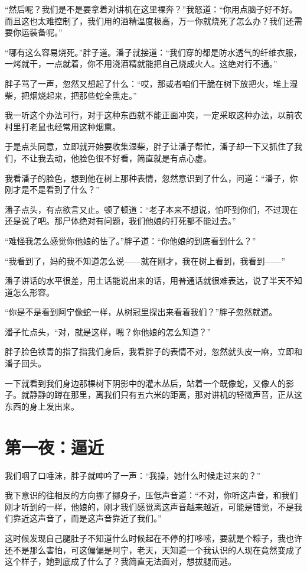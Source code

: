 “然后呢？我们是不是要拿着对讲机在这里裸奔？”我怒道：“你用点脑子好不好。而且这也太难控制了，我们用的酒精温度极高，万一你就烧死了怎么办？我们还需要你运装备呢。”

“哪有这么容易烧死。”胖子道。潘子就接道：“我们穿的都是防水透气的纤维衣服，一烤就干，一点就着，你不用浇酒精就能把自己烧成火人。这绝对行不通。”

胖子骂了一声，忽然又想起了什么：“哎，那或者咱们干脆在树下放把火，堆上湿柴，把烟烧起来，把那些蛇全熏走。”

我一听这个办法可行，对于这种东西就不能正面冲突，一定采取这种办法，以前农村里打老鼠也经常用这种烟熏。

于是点头同意，立即就开始要收集湿柴，胖子让潘子帮忙，潘子却一下又抓住了我们，不让我去动，他脸色很不好看，简直就是有点心虚。

我看潘子的脸色，想到他在树上那种表情，忽然意识到了什么，问道：“潘子，你刚才是不是看到了什么？”

潘子点头，有点欲言又止。顿了顿道：“老子本来不想说，怕吓到你们，不过现在还是说了吧。那尸体绝对有问题，我们他娘的打死都不能过去。”

“难怪我怎么感觉你他娘的怯了。”胖子道：“你他娘的到底看到什么？”

“我看到了，妈的我不知道怎么说——就在刚才，我在树上看到，我看到——”

潘子讲话的水平很差，用土话能说出来的话，用普通话就很难表达，说了半天不知道怎么形容。

“你是不是看到阿宁像蛇一样，从树冠里探出来看着我们？”胖子忽然就道。

潘子忙点头，“对，就是这样，嗯？你他娘的怎么知道？”

胖子脸色铁青的指了指我们身后，我看胖子的表情不对，忽然就头皮一麻，立即和潘子回头。

一下就看到我们身边那棵树下阴影中的灌木丛后，站着一个既像蛇，又像人的影子。就静静的蹲在那里，离我们只有五六米的距离，那对讲机的轻微声音，正从这东西的身上发出来。

\chapter{第一夜：逼近}

我们咽了口唾沫，胖子就呻吟了一声：“我操，她什么时候走过来的？”

我下意识的往相反的方向挪了挪身子，压低声音道：“不对，你听这声音，和我们刚才听到的一样，他娘的，刚才我们感觉离这声音越来越近，可能是错觉，不是我们靠近这声音了，而是这声音靠近了我们。”

这时候发现自己腿肚子不知道什么时候起在不停的打哆嗦，要就是个粽子，我也许还不是那么害怕，可这偏偏是阿宁，老天，天知道一个我认识的人现在竟然变成了这个样子，她到底成了什么了？我简直无法面对，想拔腿而逃。

